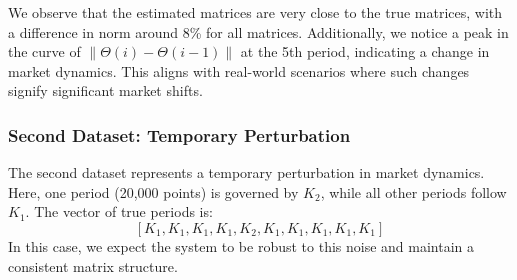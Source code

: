 \documentclass{article}
\begin{document}
We observe that the estimated matrices are very close to the true matrices, with a difference in norm around 8\% for all matrices. Additionally, we notice a peak in the curve of \(\|\Theta(i) - \Theta(i-1)\|\) at the 5th period, indicating a change in market dynamics. This aligns with real-world scenarios where such changes signify significant market shifts.

\subsubsection{Second Dataset: Temporary Perturbation}
The second dataset represents a temporary perturbation in market dynamics. Here, one period (20,000 points) is governed by \(K_2\), while all other periods follow \(K_1\). The vector of true periods is:
\[
[K_1, K_1, K_1, K_1, K_2, K_1, K_1, K_1, K_1, K_1]
\]
In this case, we expect the system to be robust to this noise and maintain a consistent matrix structure.
\end{document}
